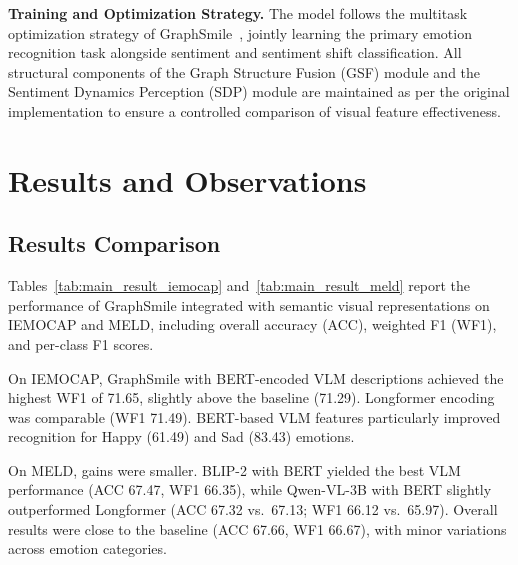 \documentclass[runningheads]{llncs}
\begin{document}
\smallskip
\noindent\textbf{Training and Optimization Strategy.}
The model follows the multitask optimization strategy of GraphSmile~\cite{li2024graphsmile}, jointly learning the primary emotion recognition task alongside sentiment and sentiment shift classification. All structural components of the Graph Structure Fusion (GSF) module and the Sentiment Dynamics Perception (SDP) module are maintained as per the original implementation to ensure a controlled comparison of visual feature effectiveness.

\section{Results and Observations}
\subsection{Results Comparison}
Tables~\ref{tab:main_result_iemocap} and~\ref{tab:main_result_meld} report the performance of GraphSmile integrated with semantic visual representations on IEMOCAP and MELD, including overall accuracy (ACC), weighted F1 (WF1), and per-class F1 scores.

On IEMOCAP, GraphSmile with BERT-encoded VLM descriptions achieved the highest WF1 of 71.65, slightly above the baseline (71.29). Longformer encoding was comparable (WF1 71.49). BERT-based VLM features particularly improved recognition for Happy (61.49) and Sad (83.43) emotions.

On MELD, gains were smaller. BLIP-2 with BERT yielded the best VLM performance (ACC 67.47, WF1 66.35), while Qwen-VL-3B with BERT slightly outperformed Longformer (ACC 67.32 vs.\ 67.13; WF1 66.12 vs.\ 65.97). Overall results were close to the baseline (ACC 67.66, WF1 66.67), with minor variations across emotion categories.
\end{document}
